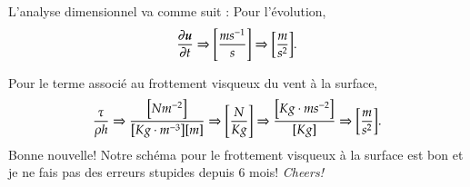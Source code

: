 \documentclass[10pt]{article}
\numberwithin{equation}{section}
\newcommand{\uu}{\vb*{u}}
\begin{document}
L'analyse dimensionnel va comme suit : Pour l'évolution,
\begin{equation}
   \pdv{\uu}{t} \Rightarrow \qty[ \frac{ms^{-1}}{s}] \Rightarrow \qty[\frac{m}{s^2}]. 
\end{equation}

Pour le terme associé au frottement visqueux du vent à la surface,
\begin{equation}
   \frac{\tau}{\rho h} \Rightarrow \frac{\qty[N m^{-2}]}{\qty[Kg\cdot m^{-3}] \qty[m]} \Rightarrow \qty[\frac{N}{Kg}] \Rightarrow \frac{\qty[Kg \cdot m s^{-2}]}{[Kg]} \Rightarrow \qty[\frac{m}{s^2}].
\end{equation}
Bonne nouvelle! Notre schéma pour le frottement visqueux à la surface est bon et je ne fais pas des erreurs stupides depuis 6 mois! \emph{Cheers!}
\end{document}
